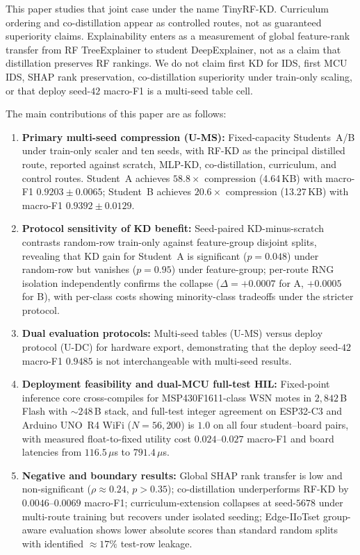 \documentclass[journal]{IEEEtran}
\newcommand{\method}{TinyRF-KD}
\newcommand{\ums}{U-MS}
\newcommand{\udc}{U-DC}
\begin{document}
This paper studies that joint case under the name \method{}.
Curriculum ordering and co-distillation appear as controlled routes, not as guaranteed superiority claims.
Explainability enters as a measurement of global feature-rank transfer from RF TreeExplainer to student DeepExplainer, not as a claim that distillation preserves RF rankings.
We do not claim first KD for IDS, first MCU IDS, SHAP rank preservation, co-distillation superiority under train-only scaling, or that deploy seed-$42$ macro-F1 is a multi-seed table cell.

The main contributions of this paper are as follows:
\begin{enumerate}
\item \textbf{Primary multi-seed compression (\ums{}):} Fixed-capacity Students~A/B under train-only scaler and ten seeds, with RF-KD as the principal distilled route, reported against scratch, MLP-KD, co-distillation, curriculum, and control routes. Student~A achieves $58.8\times$ compression (4.64\,KB) with macro-F1 $0.9203 \pm 0.0065$; Student~B achieves $20.6\times$ compression (13.27\,KB) with macro-F1 $0.9392 \pm 0.0129$.

\item \textbf{Protocol sensitivity of KD benefit:} Seed-paired KD-minus-scratch contrasts random-row train-only against feature-group disjoint splits, revealing that KD gain for Student~A is significant ($p = 0.048$) under random-row but vanishes ($p = 0.95$) under feature-group; per-route RNG isolation independently confirms the collapse ($\Delta = +0.0007$ for A, $+0.0005$ for B), with per-class costs showing minority-class tradeoffs under the stricter protocol.

\item \textbf{Dual evaluation protocols:} Multi-seed tables (\ums{}) versus deploy protocol (\udc{}) for hardware export, demonstrating that the deploy seed-$42$ macro-F1 $0.9485$ is not interchangeable with multi-seed results.

\item \textbf{Deployment feasibility and dual-MCU full-test HIL:} Fixed-point inference core cross-compiles for MSP430F1611-class WSN motes in $2{,}842$\,B Flash with ${\sim}248$\,B stack, and full-test integer agreement on ESP32-C3 and Arduino UNO~R4 WiFi ($N = 56{,}200$) is $1.0$ on all four student--board pairs, with measured float-to-fixed utility cost $0.024$--$0.027$ macro-F1 and board latencies from $116.5$\,$\mu$s to $791.4$\,$\mu$s.

\item \textbf{Negative and boundary results:} Global SHAP rank transfer is low and non-significant ($\rho \approx 0.24$, $p > 0.35$); co-distillation underperforms RF-KD by $0.0046$--$0.0069$ macro-F1; curriculum-extension collapses at seed-$5678$ under multi-route training but recovers under isolated seeding; Edge-IIoTset group-aware evaluation shows lower absolute scores than standard random splits with identified $\approx 17\%$ test-row leakage.
\end{enumerate}
\end{document}
